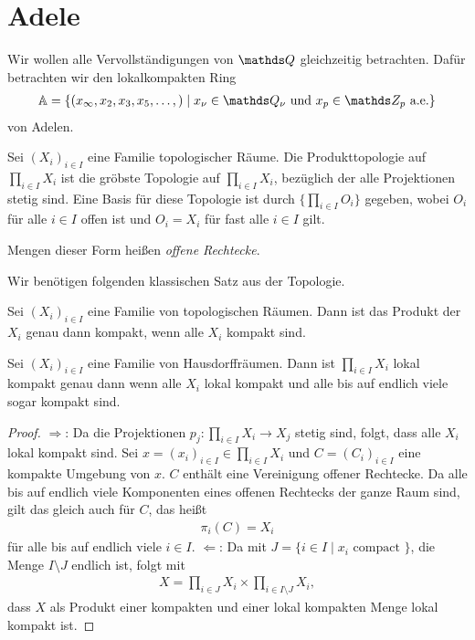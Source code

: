 \chapter{Adele}
Wir wollen alle Vervollständigungen von $\Q$ gleichzeitig betrachten.
Dafür betrachten wir den lokalkompakten Ring 
\begin{align*}
\A=\{(x_\infty,x_2,x_3,x_5,\dots,)\mid x_\nu \in \Q_\nu \text{ und } x_p \in \Z_p \text{ a.e.}\}
\end{align*}
von Adelen.

Sei $(X_i)_{i\in I}$ eine Familie topologischer Räume.
Die Produkttopologie auf $\prod_{i \in I} X_i$ ist die gröbste Topologie auf $\prod_{i \in I} X_i$, bezüglich der alle Projektionen stetig sind.
Eine Basis für diese Topologie ist durch $\{\prod_{i\in I}O_i\}$ gegeben, wobei $O_i$ für alle $i \in I$ offen ist und $O_i=X_i$ für fast alle $i \in I$ gilt.

Mengen dieser Form heißen \emph{offene Rechtecke}.

Wir benötigen folgenden klassischen Satz aus der Topologie.
\begin{thm}[Tychonoff]
Sei $(X_i)_{i \in I}$ eine Familie von topologischen Räumen. Dann ist das Produkt der $X_i$ genau dann kompakt, wenn alle $X_i$ kompakt sind.
\end{thm}

\begin{thm}
Sei $(X_i)_{i \in I}$ eine Familie von Hausdorffräumen. Dann ist $\prod_{i \in I} X_i$ lokal kompakt genau dann wenn alle $X_i$ lokal kompakt und alle bis auf endlich viele sogar kompakt sind.
\end{thm}

\begin{proof}
\glqq $\Rightarrow$\grqq : Da die Projektionen $p_j \colon \prod_{i \in I} X_i \to X_j$ stetig sind, folgt, dass alle $X_i$ lokal kompakt sind.
Sei $x=(x_i)_{i\in I} \in \prod_{i \in I} X_i$ und $C=(C_i)_{i \in I}$ eine kompakte Umgebung von $x$.
$C$ enthält eine Vereinigung offener Rechtecke. Da alle bis auf endlich viele Komponenten eines offenen Rechtecks der ganze Raum sind, gilt das gleich auch für $C$, das heißt
\begin{align*}
\pi_i(C)=X_i
\end{align*}
für alle bis auf endlich viele $i \in I$.
\glqq $\Leftarrow$\grqq : Da mit $J=\{i\in I \mid x_i \text{ compact }\}$, die Menge $I \setminus J$ endlich ist, folgt mit
\begin{align*}
X=\prod_{i \in J} X_i \times \prod_{i \in I\setminus J}X_i,
\end{align*}
dass $X$ als Produkt einer kompakten und einer lokal kompakten Menge lokal kompakt ist.
\end{proof}

